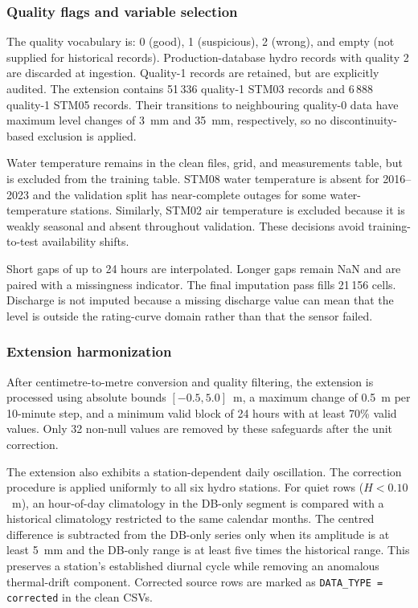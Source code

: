 \documentclass[twocolumn,twoside,a4paper,10pt]{IEEEtran}
\begin{document}
\subsubsection{Quality flags and variable selection}

The quality vocabulary is: 0 (good), 1 (suspicious), 2 (wrong), and empty
(not supplied for historical records). Production-database hydro
records with quality 2 are discarded at ingestion. Quality-1 records are
retained, but are explicitly audited. The extension contains 51\,336
quality-1 STM03 records and 6\,888 quality-1 STM05 records. Their transitions
to neighbouring quality-0 data have maximum level changes of 3~mm and 35~mm,
respectively, so no discontinuity-based exclusion is applied.

Water temperature remains in the clean files, grid, and measurements table,
but is excluded from the training table. STM08 water temperature is absent
for 2016--2023 and the validation split has near-complete outages for some
water-temperature stations. Similarly, STM02 air temperature is excluded
because it is weakly seasonal and absent throughout validation. These
decisions avoid training-to-test availability shifts.

Short gaps of up to 24 hours are interpolated. Longer gaps remain NaN and are
paired with a missingness indicator. The final imputation pass fills 21\,156
cells. Discharge is not imputed because a missing discharge value can mean
that the level is outside the rating-curve domain rather than that the sensor
failed.

\subsubsection{Extension harmonization}

After centimetre-to-metre conversion and quality filtering, the extension is
processed using absolute bounds $[-0.5,5.0]$~m, a maximum change of 0.5~m per
10-minute step, and a minimum valid block of 24 hours with at least 70\% valid
values. Only 32 non-null values are removed by these safeguards
after the unit correction.

The extension also exhibits a station-dependent daily oscillation. The
correction procedure is applied uniformly to all six hydro stations. For
quiet rows ($H<0.10$~m), an hour-of-day climatology in the DB-only segment is
compared with a historical climatology restricted to the same calendar
months. The centred difference is subtracted from the DB-only series only
when its amplitude is at least 5~mm and the DB-only range is at least five
times the historical range. This preserves a station's established diurnal
cycle while removing an anomalous thermal-drift component. Corrected source
rows are marked as \texttt{DATA\_TYPE = corrected} in the clean CSVs.
\end{document}
